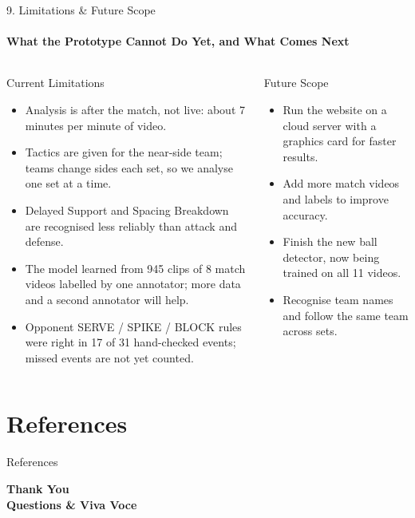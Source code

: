 \documentclass[aspectratio=169, 11pt]{beamer}
\begin{document}
\begin{frame}{9. Limitations \& Future Scope}
    \framesubtitle{What the Prototype Cannot Do Yet, and What Comes Next}
\begin{columns}[T]
\begin{block}{Current Limitations}
\footnotesize
\begin{itemize}
  \item Analysis is after the match, not live: about 7 minutes per minute of video.
  \item Tactics are given for the near-side team; teams change sides each set, so we analyse one set at a time.
  \item Delayed Support and Spacing Breakdown are recognised less reliably than attack and defense.
  \item The model learned from 945 clips of 8 match videos labelled by one annotator; more data and a second annotator will help.
  \item Opponent SERVE / SPIKE / BLOCK rules were right in 17 of 31 hand-checked events; missed events are not yet counted.
\end{itemize}
\end{block}
\begin{block}{Future Scope}
\footnotesize
\begin{itemize}
  \item Run the website on a cloud server with a graphics card for faster results.
  \item Add more match videos and labels to improve accuracy.
  \item Finish the new ball detector, now being trained on all 11 videos.
  \item Recognise team names and follow the same team across sets.
\end{itemize}
\end{block}
\end{columns}
\end{frame}

\section{References}
\nocite{*}
\begin{frame}[allowframebreaks]{References}
    \footnotesize
    
    
\end{frame}

\begin{frame}
    \centering
    {\Huge \textbf{\textcolor{amritaMaroon}{Thank You}}} \\[0.4cm]
    {\large \textbf{Questions \& Viva Voce}}
\end{frame}
\end{document}
